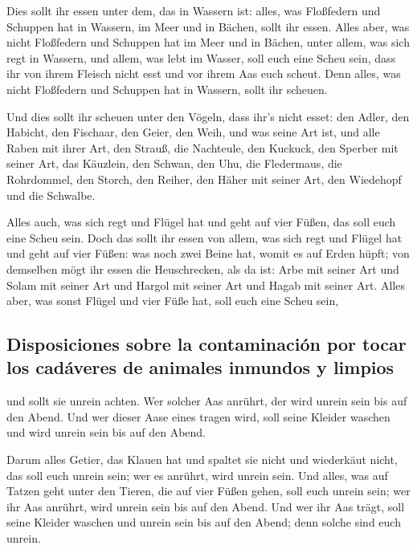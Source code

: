  Dies sollt ihr essen unter dem, das in Wassern ist:
alles, was Floßfedern und Schuppen hat in Wassern, im Meer und in
Bächen, sollt ihr essen.  Alles aber, was nicht
Floßfedern und Schuppen hat im Meer und in Bächen, unter allem, was sich
regt in Wassern, und allem, was lebt im Wasser, soll euch eine Scheu
sein,  dass ihr von ihrem Fleisch nicht esst und vor
ihrem Aas euch scheut.  Denn alles, was nicht Floßfedern
und Schuppen hat in Wassern, sollt ihr scheuen.

 Und dies sollt ihr scheuen unter den Vögeln, dass ihr's
nicht esset: den Adler, den Habicht, den Fischaar,  den
Geier, den Weih, und was seine Art ist,  und alle Raben
mit ihrer Art,  den Strauß, die Nachteule, den Kuckuck,
den Sperber mit seiner Art,  das Käuzlein, den Schwan,
den Uhu,  die Fledermaus, die Rohrdommel, 
den Storch, den Reiher, den Häher mit seiner Art, den Wiedehopf und die
Schwalbe.

 Alles auch, was sich regt und Flügel hat und geht auf
vier Füßen, das soll euch eine Scheu sein.  Doch das
sollt ihr essen von allem, was sich regt und Flügel hat und geht auf
vier Füßen: was noch zwei Beine hat, womit es auf Erden hüpft;
 von demselben mögt ihr essen die Heuschrecken, als da
ist: Arbe mit seiner Art und Solam mit seiner Art und Hargol mit seiner
Art und Hagab mit seiner Art.  Alles aber, was sonst
Flügel und vier Füße hat, soll euch eine Scheu sein,

\hypertarget{disposiciones-sobre-la-contaminaciuxf3n-por-tocar-los-caduxe1veres-de-animales-inmundos-y-limpios}{%
\subsection{Disposiciones sobre la contaminación por tocar los cadáveres
de animales inmundos y
limpios}\label{disposiciones-sobre-la-contaminaciuxf3n-por-tocar-los-caduxe1veres-de-animales-inmundos-y-limpios}}

 und sollt sie unrein achten. Wer solcher Aas anrührt,
der wird unrein sein bis auf den Abend.  Und wer dieser
Aase eines tragen wird, soll seine Kleider waschen und wird unrein sein
bis auf den Abend.

 Darum alles Getier, das Klauen hat und spaltet sie nicht
und wiederkäut nicht, das soll euch unrein sein; wer es anrührt, wird
unrein sein.  Und alles, was auf Tatzen geht unter den
Tieren, die auf vier Füßen gehen, soll euch unrein sein; wer ihr Aas
anrührt, wird unrein sein bis auf den Abend.  Und wer ihr
Aas trägt, soll seine Kleider waschen und unrein sein bis auf den Abend;
denn solche sind euch unrein.

